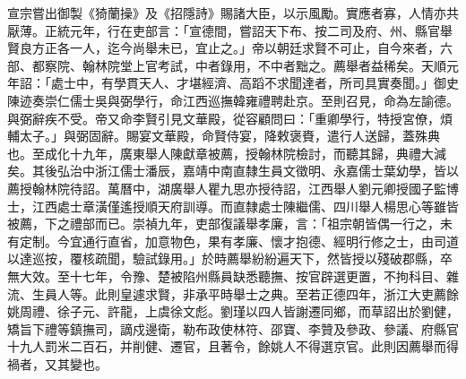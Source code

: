 宣宗嘗出御製《猗蘭操》及《招隱詩》賜諸大臣，以示風勵。實應者寡，人情亦共厭薄。正統元年，行在吏部言：「宣德間，嘗詔天下布、按二司及府、州、縣官舉賢良方正各一人，迄今尚舉未已，宜止之。」帝以朝廷求賢不可止，自今來者，六部、都察院、翰林院堂上官考試，中者錄用，不中者黜之。薦舉者益稀矣。天順元年詔：「處士中，有學貫天人、才堪經濟、高蹈不求聞達者，所司具實奏聞。」御史陳迹奏崇仁儒士吳與弼學行，命江西巡撫韓雍禮聘赴京。至則召見，命為左諭德。與弼辭疾不受。帝又命李賢引見文華殿，從容顧問曰：「重卿學行，特授宮僚，煩輔太子。」與弼固辭。賜宴文華殿，命賢侍宴，降敕褒賚，遣行人送歸，蓋殊典也。至成化十九年，廣東舉人陳獻章被薦，授翰林院檢討，而聽其歸，典禮大減矣。其後弘治中浙江儒士潘辰，嘉靖中南直隸生員文徵明、永嘉儒士葉幼學，皆以薦授翰林院待詔。萬曆中，湖廣舉人瞿九思亦授待詔，江西舉人劉元卿授國子監博士，江西處士章潢僅遙授順天府訓導。而直隸處士陳繼儒、四川舉人楊思心等雖皆被薦，下之禮部而已。崇禎九年，吏部復議舉孝廉，言：「祖宗朝皆偶一行之，未有定制。今宜通行直省，加意物色，果有孝廉、懷才抱德、經明行修之士，由司道以達巡按，覆核疏聞，驗試錄用。」於時薦舉紛紛遍天下，然皆授以殘破郡縣，卒無大效。至十七年，令豫、楚被陷州縣員缺悉聽撫、按官辟選更置，不拘科目、雜流、生員人等。此則皇遽求賢，非承平時舉士之典。至若正德四年，浙江大吏薦餘姚周禮、徐子元、許龍，上虞徐文彪。劉瑾以四人皆謝遷同鄉，而草詔出於劉健，矯旨下禮等鎮撫司，謫戍邊衛，勒布政使林符、邵寶、李贊及參政、參議、府縣官十九人罰米二百石，并削健、遷官，且著令，餘姚人不得選京官。此則因薦舉而得禍者，又其變也。

